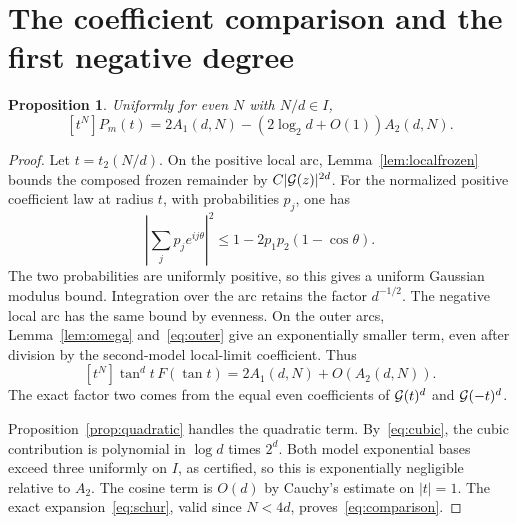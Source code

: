 \documentclass[11pt,a4paper]{article}
\newtheorem{proposition}[theorem]{Proposition}
\theoremstyle{remark}\newtheorem*{ednote}{Editorial note (ProveIt, 2026-10-01)}
\begin{document}
\section{The coefficient comparison and the first negative degree}
\begin{proposition}\label{prop:comparison}
Uniformly for even $N$ with $N/d\in I$,
\begin{equation}\label{eq:comparison}
 [t^N]P_m(t)=2A_1(d,N)-(2\log_2d+O(1))A_2(d,N).
\end{equation}
\end{proposition}
\begin{proof}
Let $t=t_2(N/d)$. On the positive local arc, Lemma~\ref{lem:localfrozen} bounds the composed frozen remainder by $C|\mathcal G(z)|^{2d}$. For the normalized positive coefficient law at radius $t$, with probabilities $p_j$, one has
\[
 \left|\sum_jp_je^{ij\theta}\right|^2
 \le1-2p_1p_2(1-\cos\theta).
\]
The two probabilities are uniformly positive, so this gives a uniform Gaussian modulus bound. Integration over the arc retains the factor $d^{-1/2}$. The negative local arc has the same bound by evenness. On the outer arcs, Lemma~\ref{lem:omega} and~\eqref{eq:outer} give an exponentially smaller term, even after division by the second-model local-limit coefficient. Thus
\[
 [t^N]\tan^dt\,F(\tan t)=2A_1(d,N)+O(A_2(d,N)).
\]
The exact factor two comes from the equal even coefficients of $\mathcal G(t)^d$ and $\mathcal G(-t)^d$.

Proposition~\ref{prop:quadratic} handles the quadratic term. By~\eqref{eq:cubic}, the cubic contribution is polynomial in $\log d$ times $2^d$. Both model exponential bases exceed three uniformly on $I$, as certified, so this is exponentially negligible relative to $A_2$. The cosine term is $O(d)$ by Cauchy's estimate on $|t|=1$. The exact expansion~\eqref{eq:schur}, valid since $N<4d$, proves~\eqref{eq:comparison}.
\end{proof}
\end{document}
